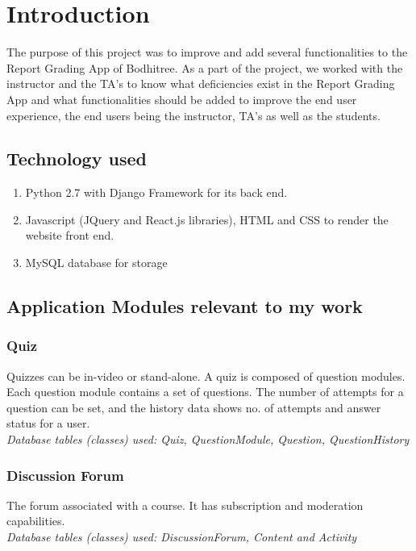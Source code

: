 \section{Introduction}
The purpose of this project was to improve and add several functionalities to the Report Grading App of Bodhitree. As a part of the project, we worked with the instructor and the TA’s to know what deficiencies exist in the Report Grading App and what functionalities should be added to improve the end user experience, the end users being the instructor, TA’s as well as the students.

\subsection{Technology used} %
\begin{enumerate}
\item Python 2.7 with Django Framework for its back end.
\item Javascript (JQuery and React.js libraries), HTML and CSS to render the website front end.
\item MySQL database for storage
\end{enumerate}

\subsection{Application Modules relevant to my work} %

\subsubsection{Quiz}
Quizzes can be in-video or stand-alone. A quiz is composed of question modules. Each question module contains a set of questions. The number of attempts for a question can be set, and the history data shows no. of attempts and answer status for a user.\\
\emph{Database tables (classes) used: Quiz, QuestionModule, Question, QuestionHistory}

\subsubsection{Discussion Forum}
The forum associated with a course. It has subscription and moderation capabilities.\\
\emph{Database tables (classes) used: DiscussionForum, Content and Activity}

